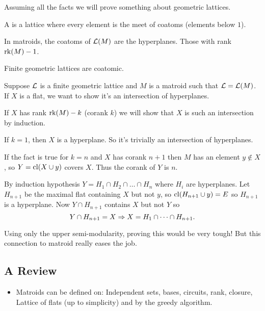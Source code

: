 \documentclass[12pt]{memoir}
\begin{document}
 Assuming all the facts we will prove something about geometric lattices. 

 \begin{Def}
    A  is a lattice where every element is the meet of coatoms (elements below $1$).
 \end{Def}

 \begin{Ex}
    In matroids, the coatoms of $\mathcal{L}(M)$ are the hyperplanes. Those with rank $\operatorname{rk}(M)-1$.
 \end{Ex}

 \begin{Th}
    Finite geometric lattices are coatomic.
 \end{Th}

 \begin{ptcbp}
    Suppose $\mathcal{L}$ is a finite geometric lattice and $M$ is a matroid such that $\mathcal{L}=\mathcal{L}(M)$. If $X$ is a flat, we want to show it's an intersection of hyperplanes.\par 
    If $X$ has rank $\operatorname{rk}(M)-k$ (corank $k$) we will show that $X$ is such an intersection by induction.\par 
    If $k=1$, then $X$ is a hyperplane. So it's trivially an intersection of hyperplanes.\par 
    If the fact is true for $k=n$ and $X$ has corank $n+1$ then $M$ has an element $y\not\in X$, so $Y=\operatorname{cl}(X\cup y)$ covers $X$. Thus the corank of $Y$ is $n$.\par 
    By induction hypothesis $Y=H_1\cap H_2\cap\dots\cap H_n$ where $H_i$ are hyperplanes. Let $H_{n+1}$ be the maximal flat containing $X$ but not $y$, so $\operatorname{cl}(H_{n+1}\cup y)=E$ so $H_{n+1}$ is a hyperplane. Now $Y\cap H_{n+1}$ contains $X$ but not $Y$ so 
    $$Y\cap H_{n+1}=X\Rightarrow X=H_1\cap\cdots\cap H_{n+1}.$$
 \end{ptcbp}

 Using only the upper semi-modularity, proving this would be very tough! But this connection to matroid really eases the job.

 \subsection{A Review}

 \begin{itemize}
    \item Matroids can be defined on: Independent sets, bases, circuits, rank, closure, Lattice of flats (up to simplicity) and by the greedy algorithm.
 \end{itemize}
\end{document}
